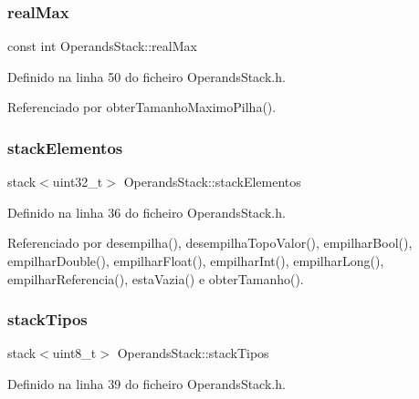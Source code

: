 \subsubsection{\texorpdfstring{real\+Max}{realMax}}
{\footnotesize\ttfamily const int Operands\+Stack\+::real\+Max\hspace{0.3cm}{\ttfamily [private]}}



Definido na linha 50 do ficheiro Operands\+Stack.\+h.



Referenciado por obter\+Tamanho\+Maximo\+Pilha().

\mbox{\label{classOperandsStack_a4d7bd7c3814e216168022849158c733d}} 
\subsubsection{\texorpdfstring{stack\+Elementos}{stackElementos}}
{\footnotesize\ttfamily stack$<$uint32\+\_\+t$>$ Operands\+Stack\+::stack\+Elementos\hspace{0.3cm}{\ttfamily [private]}}



Definido na linha 36 do ficheiro Operands\+Stack.\+h.



Referenciado por desempilha(), desempilha\+Topo\+Valor(), empilhar\+Bool(), empilhar\+Double(), empilhar\+Float(), empilhar\+Int(), empilhar\+Long(), empilhar\+Referencia(), esta\+Vazia() e obter\+Tamanho().

\mbox{\label{classOperandsStack_ad784cabd1a3153f7a870adf07215189a}} 
\subsubsection{\texorpdfstring{stack\+Tipos}{stackTipos}}
{\footnotesize\ttfamily stack$<$uint8\+\_\+t$>$ Operands\+Stack\+::stack\+Tipos\hspace{0.3cm}{\ttfamily [private]}}



Definido na linha 39 do ficheiro Operands\+Stack.\+h.



